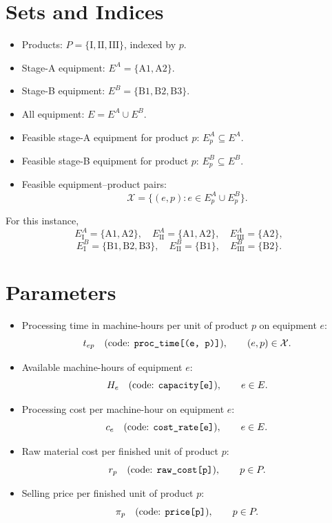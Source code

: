 \section*{Sets and Indices}

\begin{itemize}
    \item Products: $P = \{\mathrm{I}, \mathrm{II}, \mathrm{III}\}$, indexed by $p$.
    \item Stage-A equipment: $E^A = \{\mathrm{A1}, \mathrm{A2}\}$.
    \item Stage-B equipment: $E^B = \{\mathrm{B1}, \mathrm{B2}, \mathrm{B3}\}$.
    \item All equipment: $E = E^A \cup E^B$.
    \item Feasible stage-A equipment for product $p$: $E^A_p \subseteq E^A$.
    \item Feasible stage-B equipment for product $p$: $E^B_p \subseteq E^B$.
    \item Feasible equipment--product pairs:
    \[
    \mathcal{X} = \{(e,p): e \in E^A_p \cup E^B_p\}.
    \]
\end{itemize}

For this instance,
\[
E^A_{\mathrm{I}}=\{\mathrm{A1},\mathrm{A2}\},\quad
E^A_{\mathrm{II}}=\{\mathrm{A1},\mathrm{A2}\},\quad
E^A_{\mathrm{III}}=\{\mathrm{A2}\},
\]
\[
E^B_{\mathrm{I}}=\{\mathrm{B1},\mathrm{B2},\mathrm{B3}\},\quad
E^B_{\mathrm{II}}=\{\mathrm{B1}\},\quad
E^B_{\mathrm{III}}=\{\mathrm{B2}\}.
\]

\section*{Parameters}

\begin{itemize}
    \item Processing time in machine-hours per unit of product $p$ on equipment $e$:
    \[
    t_{ep} \quad \text{(code: \texttt{proc\_time[(e, p)]})}, \qquad (e,p)\in\mathcal{X}.
    \]
    \item Available machine-hours of equipment $e$:
    \[
    H_e \quad \text{(code: \texttt{capacity[e]})}, \qquad e\in E.
    \]
    \item Processing cost per machine-hour on equipment $e$:
    \[
    c_e \quad \text{(code: \texttt{cost\_rate[e]})}, \qquad e\in E.
    \]
    \item Raw material cost per finished unit of product $p$:
    \[
    r_p \quad \text{(code: \texttt{raw\_cost[p]})}, \qquad p\in P.
    \]
    \item Selling price per finished unit of product $p$:
    \[
    \pi_p \quad \text{(code: \texttt{price[p]})}, \qquad p\in P.
    \]
\end{itemize}

